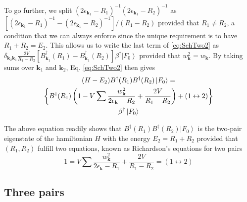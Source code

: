\documentclass[aps,prb,superscriptaddress,showpacs,reprint,lengthcheck]{revtex4-1}
\begin{document}
To go further, we split $\left(2\epsilon_{\mathbf{k} _1}-R_1\right)
^{-1}\left(2\epsilon_{\mathbf{k} _1}-R_2\right) ^{-1}$ as $\left[%
\left(2\epsilon_{\mathbf{k} _1}-R_1\right) ^{-1}-\left(2\epsilon_{\mathbf{k}
_1}-R_2\right) ^{-1}\right] /\left(R_1-R_2\right) $ provided that $R_1\neq{}%
R_2$, a condition that we can always enforce since the unique requirement is to have $R_1+R_2=E_2$. This allows us to write the last term of \eqref{eq:SchTwo2} as $\delta_{{\mathbf{k} _2}{\mathbf{k} _1}}\frac{2V}{R_1-R_2}[B^{\dagger}_{\mathbf{k} _1}(R_1)-B^{\dagger}_{\mathbf{k} _1}(R_2)]\beta^\dagger\left|F_0\right>  $ provided that $w^2_{{\mathbf{k} }}=w_{{\mathbf{k} }}$. By taking sums over $\mathbf{k} _1$ and $\mathbf{k} _2$, Eq. %
\eqref{eq:SchTwo2} then gives 
\begin{multline}  \label{eq:SchTwo3}
(H-E_2)B^{\dagger}(R_1)B^{\dagger}(R_2)\left|F_0\right>   = \\
\left\{B^{\dagger}(R_1)\left(1-V\sum\frac{w_{\mathbf{k} }^2}{2\epsilon_{%
\mathbf{k} }-R_2}+\frac{2V}{R_1-R_2}\right) +(1\leftrightarrow2)\right\}  \\
\beta^{\dagger}\left|F_0\right>  
\end{multline}


The above equation readily shows that $B^{\dagger}(R_1)B^{\dagger}(R_2)%
\left|F_0\right>  $ is the two-pair eigenstate of the hamiltonian $H$ with the energy $%
E _2=R_1+R_2$ provided that $\left(R_1,R_2\right) $ fulfill two
equations, known as Richardson's equations for two pairs 
\begin{equation}
1=V\sum\frac{w_{\mathbf{k} }^2}{2\epsilon_{\mathbf{k} }-R_1}+\frac{2V}{R_1-R_2}%
=(1\leftrightarrow2)
\end{equation}

\subsection{Three pairs}
\end{document}
